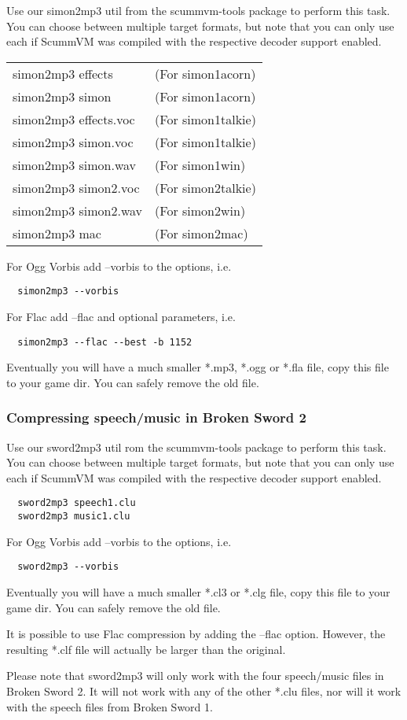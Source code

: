 Use our simon2mp3 util from the scummvm-tools package to perform this task.
You can choose between multiple target formats, but note that you can only use
each if ScummVM was compiled with the respective decoder support enabled.

\begin{tabular}[h]{ll}
  simon2mp3 effects    &(For simon1acorn)\\
  simon2mp3 simon      &(For simon1acorn)\\
  simon2mp3 effects.voc&(For simon1talkie)\\
  simon2mp3 simon.voc  &(For simon1talkie)\\
  simon2mp3 simon.wav  &(For simon1win)\\
  simon2mp3 simon2.voc &(For simon2talkie)\\
  simon2mp3 simon2.wav &(For simon2win)\\
  simon2mp3 mac        &(For simon2mac)\\
\end{tabular}

For Ogg Vorbis add --vorbis to the options, i.e.
\begin{verbatim}
  simon2mp3 --vorbis
\end{verbatim}
%
For Flac add --flac and optional parameters, i.e.
\begin{verbatim}
  simon2mp3 --flac --best -b 1152 
\end{verbatim}
%
Eventually you will have a much smaller *.mp3, *.ogg or *.fla file, copy this
file to your game dir. You can safely remove the old file.


\subsubsection{Compressing speech/music in Broken Sword 2}

Use our sword2mp3 util rom the scummvm-tools package to perform this task.
You can choose between multiple target formats, but note  that you can only use
each if ScummVM was compiled with the respective decoder support enabled.

\begin{verbatim}
  sword2mp3 speech1.clu
  sword2mp3 music1.clu
\end{verbatim}
%
For Ogg Vorbis add --vorbis to the options, i.e.
\begin{verbatim}
  sword2mp3 --vorbis
\end{verbatim}
%
Eventually you will have a much smaller *.cl3 or *.clg file, copy this file to
your game dir. You can safely remove the old file.

It is possible to use Flac compression by adding the --flac option. However,
the resulting *.clf file will actually be larger than the original.

Please note that sword2mp3 will only work with the four speech/music files in
Broken Sword 2. It will not work with any of the other *.clu files, nor will it
work with the speech files from Broken Sword 1.
